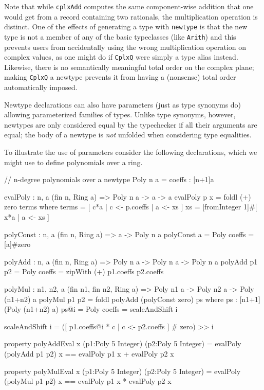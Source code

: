 Note that while \texttt{cplxAdd} computes the same component-wise
addition that one would get from a record containing two rationals,
the multiplication operation is distinct.  One of the effects of
generating a type with \texttt{newtype} is that the new type is not a
member of any of the basic typeclasses (like \texttt{Arith}) and this
prevents users from accidentally using the wrong multiplication
operation on complex values, as one might do if \texttt{CplxQ} were
simply a type alias instead.  Likewise, there is no semantically
meaningful total order on the complex plane; making \texttt{CplxQ} a
newtype prevents it from having a (nonsense) total order automatically
imposed.

Newtype declarations can also have parameters (just as type synonyms
do) allowing parameterized families of types.  Unlike type synonyms,
however, newtypes are only considered equal by the typechecker if all
their arguments are equal; the body of a newtype is \emph{not}
unfolded when considering type equalities.

To illustrate the use of parameters consider the following
declarations, which we might use to define polynomials over a ring.

\begin{code}
  // n-degree polynomials over a
  newtype Poly n a = { coeffs : [n+1]a }

  evalPoly : {n, a} (fin n, Ring a) => Poly n a -> a -> a
  evalPoly p x = foldl (+) zero terms
    where
      terms = [ c*a | c <- p.coeffs | a <- xs ]
      xs    = [fromInteger 1]#[ x*a | a <- xs ]

  polyConst : {n, a} (fin n, Ring a) => a -> Poly n a
  polyConst a = Poly { coeffs = [a]#zero }

  polyAdd : {n, a} (fin n, Ring a) => Poly n a -> Poly n a -> Poly n a
  polyAdd p1 p2 = Poly { coeffs = zipWith (+) p1.coeffs p2.coeffs }

  polyMul : {n1, n2, a} (fin n1, fin n2, Ring a) =>
    Poly n1 a -> Poly n2 a -> Poly (n1+n2) a
  polyMul p1 p2 = foldl polyAdd (polyConst zero) ps
    where
      ps : [n1+1](Poly (n1+n2) a)
      ps@i = Poly{ coeffs = scaleAndShift i }

      scaleAndShift i =
        ([ p1.coeffs@i * c | c <- p2.coeffs ] # zero) >> i

  property polyAddEval x (p1:Poly 5 Integer) (p2:Poly 5 Integer) =
    evalPoly (polyAdd p1 p2) x == evalPoly p1 x + evalPoly p2 x

  property polyMulEval x (p1:Poly 5 Integer) (p2:Poly 5 Integer) =
    evalPoly (polyMul p1 p2) x == evalPoly p1 x * evalPoly p2 x
\end{code}

